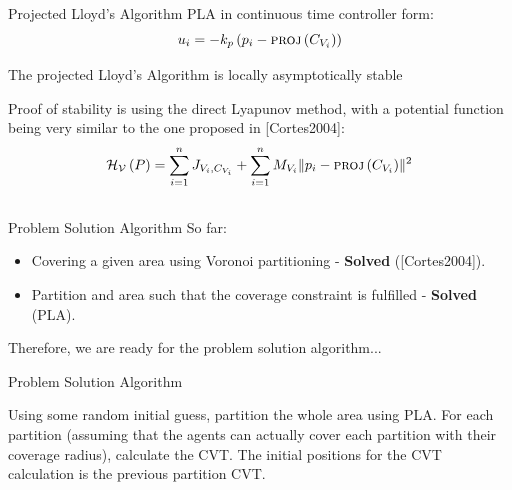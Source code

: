 \documentclass[t]{beamer}
\newcommand{\norm}[1]{\lVert #1 \rVert}
\begin{document}
\begin{frame}[label=projlloydsalgotheorem]{Projected Lloyd's Algorithm}
PLA in continuous time controller form:
\begin{equation*} \label{ProjectedLloydsContol}
u_{i} = -k_{p}\left( p_i - \textsc{proj}\left( C_{V_{i}} \right) \right)
\end{equation*} 

\begin{theorem}
The projected Lloyd's Algorithm is locally asymptotically stable
\end{theorem}

Proof of stability is using the direct Lyapunov method, with a potential function being very similar to the one proposed in [Cortes2004]:
\begin{equation*}
\mathcal{H_{V}}\left( P \right) = \sum_{i=1}^{n} J_{V_i,C_{V_i}} + \sum_{i=1}^{n} M_{V_i} \norm{p_i - \textsc{proj}\left( C_{V_i}\right)}^2
\end{equation*}
\end{frame}

\subsection[Problem Solution Algorithm]{}
\begin{frame}[label=probsolalg1]{Problem Solution Algorithm}
So far:
\begin{itemize}
\item Covering a given area using Voronoi partitioning - \textbf{Solved} ([Cortes2004]).
\item Partition and area such that the coverage constraint is fulfilled - \textbf{Solved} (PLA).
\end{itemize}

Therefore, we are ready for the problem solution algorithm...
\end{frame}

\begin{frame}[label=probsolalg2]{Problem Solution Algorithm}
\begin{algorithm}[H]
\caption{Problem Solution Algorithm}\label{GeneralProbSolution}
\begin{algorithmic}[1]
\State Using some random initial guess, partition the whole area using PLA.
\State For each partition (assuming that the agents can actually cover each partition with their coverage radius), calculate the CVT. The initial positions for the CVT calculation is the previous partition CVT.
\end{algorithmic}
\end{algorithm}
\end{frame}
\end{document}
